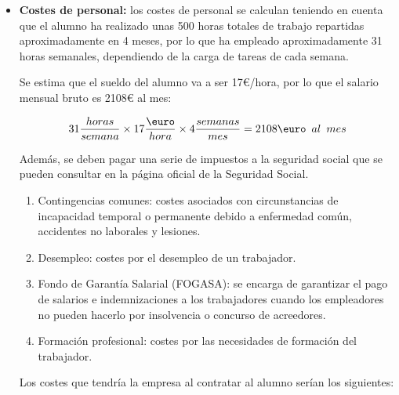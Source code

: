 \begin{itemize}
    \item \textbf{Costes de personal:} los costes de personal se calculan teniendo en cuenta que el alumno ha realizado unas 500 horas totales de trabajo repartidas aproximadamente en 4 meses, por lo que ha empleado aproximadamente 31 horas semanales, dependiendo de la carga de tareas de cada semana.

Se estima que el sueldo del alumno va a ser 17€/hora, por lo que el salario mensual bruto es 2108€ al mes:

$$ 31\frac{horas}{semana}\times17\frac{\text{\euro}}{hora}\times4\frac{semanas}{mes}=2108\text{\euro}\hspace{0.5em}al\hspace{0.5em}mes  $$

Además, se deben pagar una serie de impuestos a la seguridad social que se pueden consultar en la página oficial de la Seguridad Social\cite{ss}.

\begin{enumerate}
    \item Contingencias comunes: costes asociados con circunstancias de incapacidad temporal o permanente debido a enfermedad común, accidentes no laborales y lesiones.
    \item Desempleo: costes por el desempleo de un trabajador.
    \item Fondo de Garantía Salarial (FOGASA): se encarga de garantizar el pago de salarios e indemnizaciones a los trabajadores cuando los empleadores no pueden hacerlo por insolvencia o concurso de acreedores.
    \item Formación profesional: costes por las necesidades de formación del trabajador.
\end{enumerate}

Los costes que tendría la empresa al contratar al alumno serían los siguientes:


\end{itemize}
